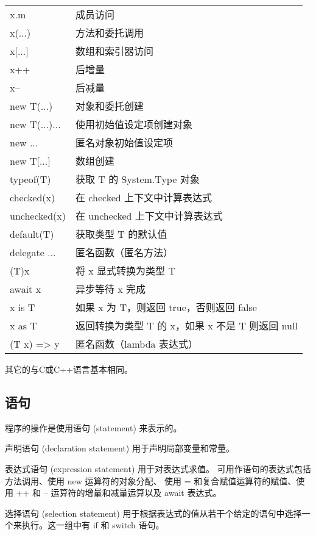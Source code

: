 \begin{tabular}{|l|l|}
\hline
x.m            &          成员访问  \\
x(...)         &           方法和委托调用  \\
x[...]         &           数组和索引器访问  \\
x++            &        后增量  \\
x--            &           后减量  \\
new T(...)     &       对象和委托创建  \\
new T(...){...}&      使用初始值设定项创建对象  \\
new {...}      &         匿名对象初始值设定项  \\
new T[...]     &        数组创建  \\
typeof(T)      &      获取 T 的 System.Type 对象  \\
checked(x)     &    在 checked 上下文中计算表达式  \\
unchecked(x)   & 在 unchecked 上下文中计算表达式  \\
default(T)     &       获取类型 T 的默认值  \\
delegate {...} &      匿名函数（匿名方法）  \\
(T)x           &             将 x 显式转换为类型 T  \\
await x        &         异步等待 x 完成  \\
x is T         &            如果 x 为 T，则返回 true，否则返回 false  \\
x as T         &           返回转换为类型 T 的 x，如果 x 不是 T 则返回 null  \\
(T x) => y     &       匿名函数（lambda 表达式）  \\
\hline
\end{tabular}

其它的与C或C++语言基本相同。

\subsection{ 语句 }
程序的操作是使用语句 (statement) 来表示的。

声明语句 (declaration statement) 用于声明局部变量和常量。

表达式语句 (expression statement) 用于对表达式求值。
可用作语句的表达式包括方法调用、使用 new 运算符的对象分配、
使用 = 和复合赋值运算符的赋值、使用 ++ 和 -- 运算符的增量和减量运算以及 await 表达式。

选择语句 (selection statement) 用于根据表达式的值从若干个给定的语句中选择一个来执行。这一组中有 if 和 switch 语句。

